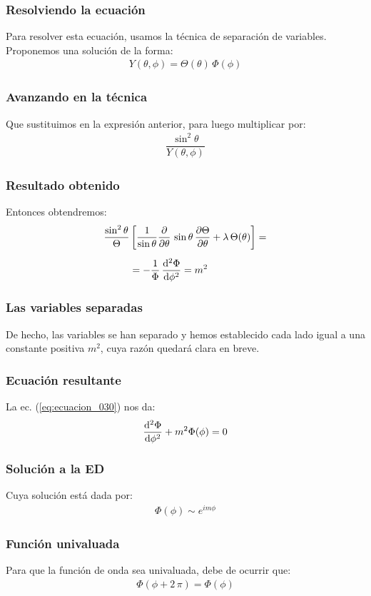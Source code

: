 \documentclass[12pt]{beamer}
\begin{document}
\begin{frame}
\frametitle{Resolviendo la ecuación}
Para resolver esta ecuación, usamos la técnica de separación de variables.
\\
\bigskip
\pause
Proponemos una solución de la forma:
\pause
\begin{align}
Y(\theta, \phi) = \Theta(\theta) \, \Phi(\phi)
\label{eq:ecuacion_029}
\end{align}
\end{frame}
\begin{frame}
\frametitle{Avanzando en la técnica}
Que sustituimos en la expresión anterior, para luego multiplicar por:
\pause
\begin{align*}
\dfrac{\sin^{2} \theta}{Y(\theta, \phi)}
\end{align*}
\end{frame}
\begin{frame}
\frametitle{Resultado obtenido}
Entonces obtendremos:
\pause
\begin{align}
\begin{aligned}
\dfrac{\sin^{2} \theta}{\Theta} &\left[ \dfrac{1}{\sin \theta} \pdv{\theta} \, \sin \theta \, \pdv{\Theta}{\theta} + \lambda \, \Theta (\theta) \right] = \\[0.5em]
&= - \dfrac{1}{\Phi} \, \dv[2]{\Phi}{\phi} = m^{2}
\end{aligned}
\label{eq:ecuacion_030}
\end{align}
\end{frame}
\begin{frame}
\frametitle{Las variables separadas}
De hecho, las variables se han separado y hemos establecido cada lado igual a una constante positiva $m^{2}$, cuya razón quedará clara en breve.
\end{frame}
\begin{frame}
\frametitle{Ecuación resultante}
La ec. (\ref{eq:ecuacion_030}) nos da:
\pause
\begin{align*}
\dv[2]{\Phi}{\phi} + m^{2} \Phi (\phi) = 0
\end{align*}
\end{frame}
\begin{frame}
\frametitle{Solución a la ED}
Cuya solución está dada por:
\pause
\begin{align*}
\Phi(\phi) \sim e^{i m \phi}
\end{align*}
\end{frame}
\begin{frame}
\frametitle{Función univaluada}
Para que la función de onda sea univaluada, debe de ocurrir que:
\pause
\begin{align}
\Phi(\phi +  2 \, \pi) = \Phi(\phi)
\label{eq:ecuacion_031}
\end{align}
\end{frame}
\end{document}
